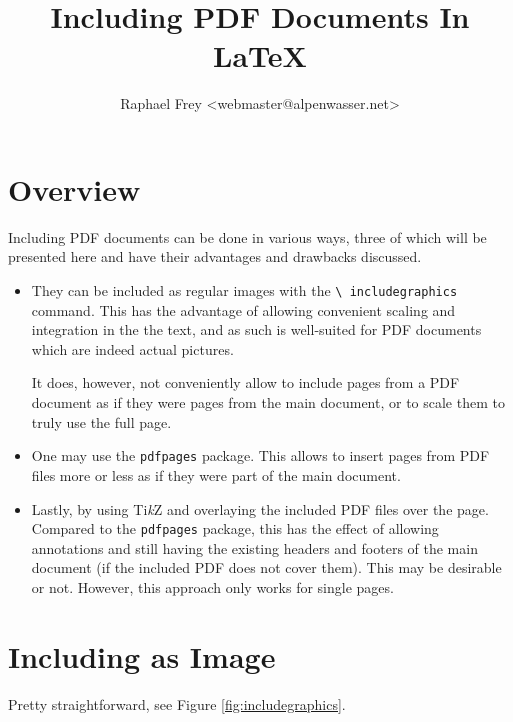 \documentclass[a4paper,oneside]{article}
\title{Including PDF Documents In \LaTeX}
\author{Raphael Frey <webmaster@alpenwasser.net>}
\newcommand\code[1]{\texttt{#1}}
\begin{document}
\maketitle

\tableofcontents

\section{Overview}

Including PDF documents  can be done in  various ways, three of  which will be
presented here and have their advantages and drawbacks discussed.

\begin{itemize}
    \item
        They can be  included as regular images  with the \code{\textbackslash
        includegraphics} command. This has the advantage of allowing convenient
        scaling and integration in the the text, and as such is well-suited for
        PDF documents which are indeed actual pictures.

        It does, however,  not conveniently allow to include pages  from a PDF
        document as  if they were  pages from the  main document, or  to scale
        them to truly use the full page.
    \item
        One may use  the \code{pdfpages} package. This allows  to insert pages
        from PDF files more or less as if they were part of the main document.
    \item
        Lastly, by  using Ti\emph{k}Z  and overlaying  the included  PDF files
        over the page. Compared  to the \code{pdfpages} package,  this has the
        effect of allowing  annotations and still having  the existing headers
        and footers of  the main document (if the included  PDF does not cover
        them). This may be desirable or not. However, this approach only works
        for single pages.
\end{itemize}

\clearpage
\section{Including as Image}
\label{sec:includegraphics}

Pretty straightforward, see Figure \ref{fig:includegraphics}.
\end{document}
